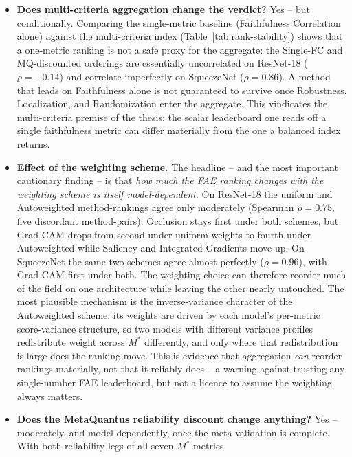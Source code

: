 \begin{itemize}
    \item \textbf{Does multi-criteria aggregation change the verdict?}
    Yes -- but conditionally. Comparing the single-metric baseline (Faithfulness
    Correlation alone) against the multi-criteria index
    (Table~\ref{tab:rank-stability}) shows that a one-metric ranking is not a
    safe proxy for the aggregate: the Single-FC and MQ-discounted orderings
    are essentially uncorrelated on ResNet-18 ($\rho = -0.14$) and correlate
    imperfectly on
    SqueezeNet ($\rho = 0.86$). A method that leads on Faithfulness alone is not
    guaranteed to survive once Robustness, Localization, and Randomization enter
    the aggregate. This vindicates the multi-criteria premise of the thesis: the
    scalar leaderboard one reads off a single faithfulness metric can differ
    materially from the one a balanced index returns.
    \item \textbf{Effect of the weighting scheme.} The headline -- and the most
    important cautionary finding -- is that \emph{how much the FAE ranking
    changes with the weighting scheme is itself model-dependent}. On ResNet-18
    the uniform and Autoweighted method-rankings agree only moderately
    (Spearman $\rho = 0.75$, five discordant method-pairs): Occlusion stays
    first under both schemes, but Grad-CAM drops from second under uniform
    weights to fourth under Autoweighted while Saliency and Integrated
    Gradients move up. On SqueezeNet the same two schemes agree almost
    perfectly ($\rho = 0.96$), with Grad-CAM first under both. The weighting
    choice can therefore reorder much of the field on one architecture while
    leaving the other nearly untouched. The
    most plausible mechanism is the inverse-variance character of the
    Autoweighted scheme: its weights are driven by each model's per-metric
    score-variance structure, so two models with different variance profiles
    redistribute weight across $M^{*}$ differently, and only where that
    redistribution is large does the ranking move. This is evidence that
    aggregation \emph{can} reorder rankings materially, not that it reliably
    does -- a warning
    against trusting any single-number FAE leaderboard, but not a licence to
    assume the weighting always matters.
    \item \textbf{Does the MetaQuantus reliability discount change anything?}
    Yes -- moderately, and model-dependently, once the meta-validation is
    complete. With both reliability legs of all seven $M^{*}$ metrics

\end{itemize}
